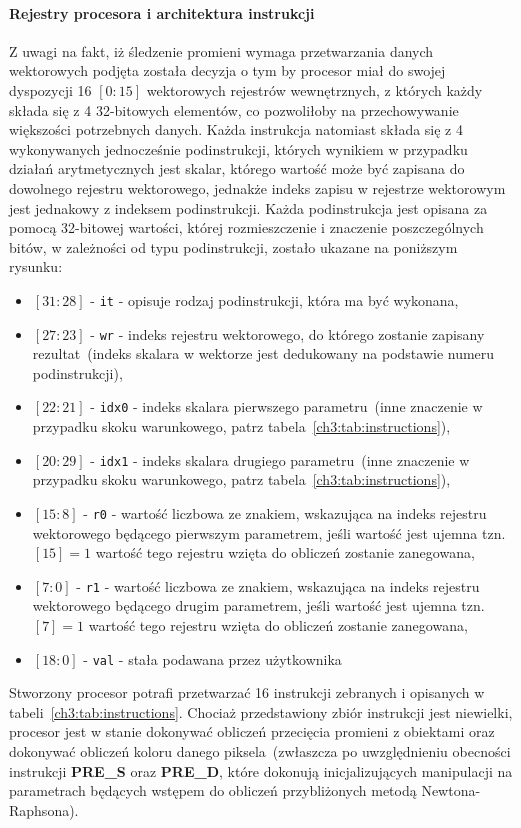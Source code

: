 \paragraph{Rejestry procesora i architektura instrukcji}
Z uwagi na fakt, iż śledzenie promieni wymaga przetwarzania danych wektorowych podjęta została decyzja o tym by procesor miał do swojej dyspozycji 16 $[0:15]$ wektorowych rejestrów wewnętrznych, z których każdy składa się z 4 32-bitowych elementów, co pozwoliłoby na przechowywanie większości potrzebnych danych. Każda instrukcja natomiast składa się z 4 wykonywanych jednocześnie podinstrukcji, których wynikiem w przypadku działań arytmetycznych jest skalar, którego wartość może być zapisana  do dowolnego rejestru wektorowego, jednakże indeks zapisu w rejestrze wektorowym jest jednakowy z indeksem podinstrukcji. Każda podinstrukcja jest opisana za pomocą 32-bitowej wartości, której rozmieszczenie i znaczenie poszczególnych bitów, w zależności od typu podinstrukcji, zostało ukazane na poniższym rysunku:
\begin{itemize}
\item[] $[31:28]$ - \texttt{it} - opisuje rodzaj podinstrukcji, która ma być wykonana,
\item[] $[27:23]$ - \texttt{wr} - indeks rejestru wektorowego, do którego zostanie zapisany rezultat~(indeks skalara w wektorze jest dedukowany na podstawie numeru podinstrukcji),
\item[] $[22:21]$ - \texttt{idx0} - indeks skalara pierwszego parametru~(inne znaczenie w przypadku skoku warunkowego, patrz tabela~\ref{ch3:tab:instructions}),
\item[] $[20:29]$ - \texttt{idx1} - indeks skalara drugiego parametru~(inne znaczenie w przypadku skoku warunkowego, patrz tabela~\ref{ch3:tab:instructions}),
\item[] $[15:8]$ - \texttt{r0} - wartość liczbowa ze znakiem, wskazująca na indeks rejestru wektorowego będącego pierwszym parametrem, jeśli wartość jest ujemna tzn. $[15]=1$ wartość tego rejestru wzięta do obliczeń zostanie zanegowana,
\item[] $[7:0]$ - \texttt{r1} - wartość liczbowa ze znakiem, wskazująca na indeks rejestru wektorowego będącego drugim parametrem, jeśli wartość jest ujemna tzn. $[7]=1$ wartość tego rejestru wzięta do obliczeń zostanie zanegowana,
\item[] $[18:0]$ - \texttt{val} - stała podawana przez użytkownika
\end{itemize}
Stworzony procesor potrafi przetwarzać 16 instrukcji zebranych i opisanych w tabeli~\ref{ch3:tab:instructions}. Chociaż przedstawiony zbiór instrukcji jest niewielki, procesor jest w stanie dokonywać obliczeń przecięcia promieni z obiektami oraz dokonywać obliczeń koloru danego piksela~(zwłaszcza po uwzględnieniu obecności instrukcji \textbf{PRE\_S} oraz \textbf{PRE\_D}, które dokonują inicjalizujących manipulacji na parametrach będących wstępem do obliczeń przybliżonych metodą Newtona-Raphsona). 

